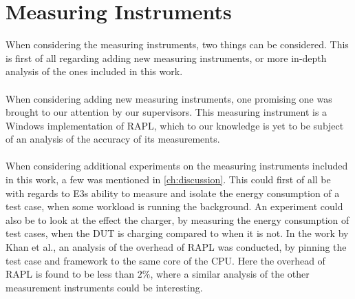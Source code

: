 \section{Measuring Instruments}

When considering the measuring instruments, two things can be considered. This is first of all regarding adding new measuring instruments, or more in-depth analysis of the ones included in this work.

\paragraph*{}
When considering adding new measuring instruments, one promising one was brought to our attention by our supervisors. This measuring instrument is a Windows implementation of RAPL, which to our knowledge is yet to be subject of an analysis of the accuracy of its measurements.

\paragraph*{}
When considering additional experiments on the measuring instruments included in this work, a few was mentioned in \cref{ch:discussion}. This could first of all be with regards to E3s ability to measure and isolate the energy consumption of a test case, when some workload is running the background. An experiment could also be to look at the effect the charger, by measuring the energy consumption of test cases, when the DUT is charging compared to when it is not. In the work by Khan et al.\cite[]{RAPL_in_action}, an analysis of the overhead of RAPL was conducted, by pinning the test case and framework to the same core of the CPU. Here the overhead of RAPL is found to be less than $2\%$, where a similar analysis of the other measurement instruments could be interesting.